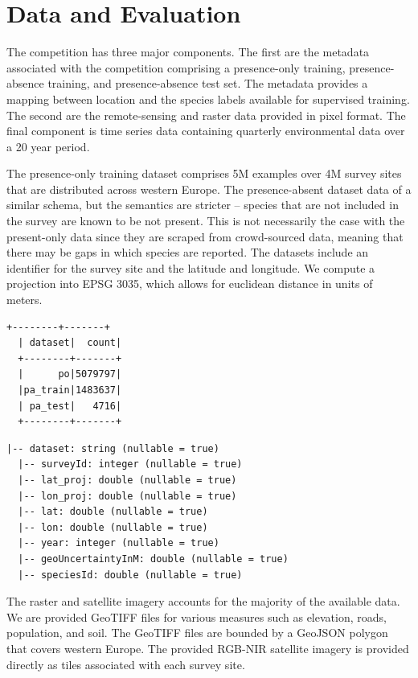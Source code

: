 \documentclass[]{style/ceurart}
\begin{document}
\section{Data and Evaluation}

The competition has three major components. 
The first are the metadata associated with the competition comprising a presence-only training, presence-absence training, and presence-absence test set. 
The metadata provides a mapping between location and the species labels available for supervised training. 
The second are the remote-sensing and raster data provided in pixel format. 
The final component is time series data containing quarterly environmental data over a 20 year period. 

The presence-only training dataset comprises 5M examples over 4M survey sites that are distributed across western Europe. 
The presence-absent dataset data of a similar schema, but the semantics are stricter – species that are not included in the survey are known to be not present. 
This is not necessarily the case with the present-only data since they are scraped from crowd-sourced data, meaning that there may be gaps in which species are reported. 
The datasets include an identifier for the survey site and the latitude and longitude. 
We compute a projection into EPSG 3035, which allows for euclidean distance in units of meters. 

\begin{lstlisting}[caption={Number of survey identifiers per dataset.}, captionpos=b,label={lst:counts}]
  +--------+-------+
  | dataset|  count|
  +--------+-------+
  |  	 po|5079797|
  |pa_train|1483637|
  | pa_test|   4716|
  +--------+-------+  
\end{lstlisting}

\begin{lstlisting}[caption={Schema of the metadata.}, captionpos=b,label={lst:schema}]
  |-- dataset: string (nullable = true)
  |-- surveyId: integer (nullable = true)
  |-- lat_proj: double (nullable = true)
  |-- lon_proj: double (nullable = true)
  |-- lat: double (nullable = true)
  |-- lon: double (nullable = true)
  |-- year: integer (nullable = true)
  |-- geoUncertaintyInM: double (nullable = true)
  |-- speciesId: double (nullable = true) 
\end{lstlisting}

The raster and satellite imagery accounts for the majority of the available data. 
We are provided GeoTIFF files for various measures such as elevation, roads, population, and soil. 
The GeoTIFF files are bounded by a GeoJSON polygon that covers western Europe. 
The provided RGB-NIR satellite imagery is provided directly as tiles associated with each survey site.
\end{document}
